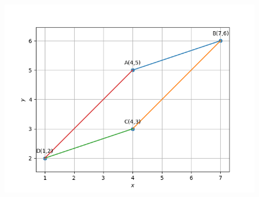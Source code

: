 \documentclass[12pt]{article}
\begin{document}
\begin{enumerate}
\begin{figure}[!h]
	\begin{center} 
	    \includegraphics[width=\columnwidth]{figs/quad3}
	\end{center}
\caption{}
\label{fig:Fig3}
\end{figure}
\end{enumerate}
\end{document}
